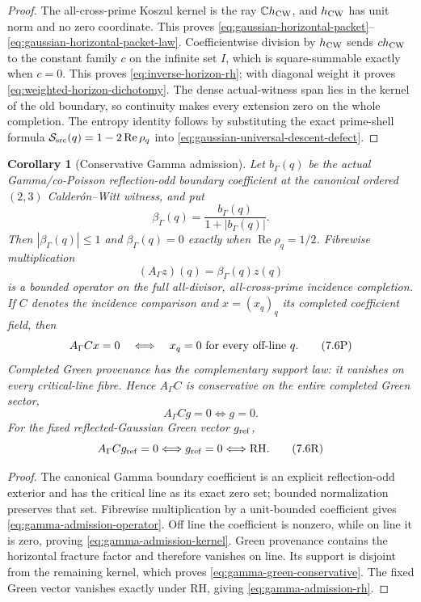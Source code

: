 \documentclass[11pt]{article}
\newtheorem{corollary}[theorem]{Corollary}
\theoremstyle{definition}
\theoremstyle{remark}
\newcommand{\C}{\mathbb C}
\newcommand{\Rea}{\operatorname{Re}}
\begin{document}
\begin{proof}
The all-cross-prime Koszul kernel is the ray \(\C h_{\rm CW}\), and
\(h_{\rm CW}\) has unit norm and no zero coordinate.  This proves
\eqref{eq:gaussian-horizontal-packet}--\eqref{eq:gaussian-horizontal-packet-law}.
Coefficientwise division by \(h_{\rm CW}\) sends
\(c h_{\rm CW}\) to the constant family \(c\) on the infinite set \(I\),
which is square-summable exactly when \(c=0\).  This proves
\eqref{eq:inverse-horizon-rh}; with diagonal weight it proves
\eqref{eq:weighted-horizon-dichotomy}.  The dense actual-witness span lies in the
kernel of the old boundary, so continuity makes every extension zero on the
whole completion.  The entropy identity follows by substituting the exact
prime-shell formula \(\mathcal S_{\rm src}(q)=1-2\Rea\rho_q\) into
\eqref{eq:gaussian-universal-descent-defect}.
\end{proof}

\begin{corollary}[Conservative Gamma admission]
\label{cor:gamma-admission-conservative}
Let \(b_\Gamma(q)\) be the actual Gamma/co-Poisson reflection-odd boundary
coefficient at the canonical ordered \((2,3)\) Calder\'on--Witt witness, and
put
\[
 \beta_\Gamma(q)=\frac{b_\Gamma(q)}{1+|b_\Gamma(q)|}.
\tag{7.6N}\label{eq:normalized-gamma-admission}
\]
Then \(|\beta_\Gamma(q)|\le1\) and
\(\beta_\Gamma(q)=0\) exactly when \(\Rea\rho_q=1/2\).  Fibrewise
multiplication
\[
               (A_\Gamma z)(q)=\beta_\Gamma(q)z(q)
\tag{7.6O}\label{eq:gamma-admission-operator}
\]
is a bounded operator on the full all-divisor, all-cross-prime incidence
completion.  If \(C\) denotes the incidence comparison and
\(x=(x_q)_q\) its completed coefficient field, then
\[
 A_\Gamma Cx=0
 \quad\Longleftrightarrow\quad
 x_q=0\ \hbox{for every off-line }q.
\tag{7.6P}\label{eq:gamma-admission-kernel}
\]
Completed Green provenance has the complementary support law: it vanishes
on every critical-line fibre.  Hence \(A_\Gamma C\) is conservative on the
entire completed Green sector,
\[
              A_\Gamma Cg=0\Longleftrightarrow g=0.
\tag{7.6Q}\label{eq:gamma-green-conservative}
\]
For the fixed reflected-Gaussian Green vector \(g_{\rm ref}\),
\[
             A_\Gamma Cg_{\rm ref}=0
             \Longleftrightarrow g_{\rm ref}=0
             \Longleftrightarrow\mathrm{RH}.
\tag{7.6R}\label{eq:gamma-admission-rh}
\]
\end{corollary}

\begin{proof}
The canonical Gamma boundary coefficient is an explicit reflection-odd
exterior and has the critical line as its exact zero set; bounded
normalization preserves that set.  Fibrewise multiplication by a unit-bounded
coefficient gives \eqref{eq:gamma-admission-operator}.  Off line the
coefficient is nonzero, while on line it is zero, proving
\eqref{eq:gamma-admission-kernel}.  Green provenance contains the horizontal
fracture factor and therefore vanishes on line.  Its support is disjoint from
the remaining kernel, which proves \eqref{eq:gamma-green-conservative}.
The fixed Green vector vanishes exactly under RH, giving
\eqref{eq:gamma-admission-rh}.
\end{proof}
\end{document}
